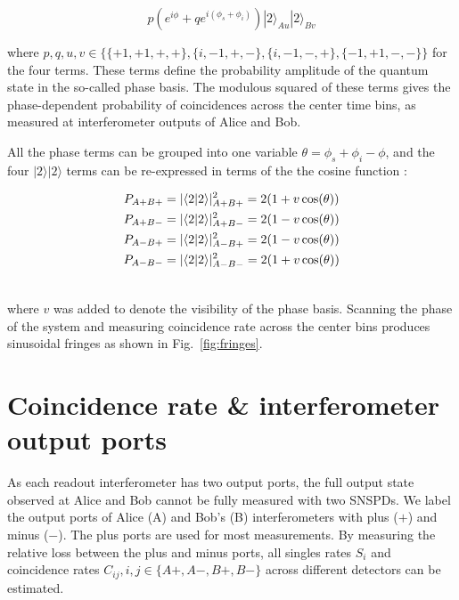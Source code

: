 \documentclass[11pt]{caltech_thesis} %
\begin{document}
$$p\left(e^{i \phi}+qe^{i\left(\phi_s+\phi_i\right)}\right)|2\rangle_{Au}|2\rangle_{Bv} $$

where $p, q, u, v \in \{\{+1,+1, +, +\}, \{i,-1, +, -\}, \{i,-1, -, +\}, \{-1,+1, -, -\}\}$ for the four terms. These terms define the probability amplitude of the quantum state in the so-called phase basis. The modulous squared of these terms gives the phase-dependent probability of coincidences across the center time bins, as measured at interferometer outputs of Alice and Bob.

All the phase terms can be grouped into one variable $\theta = \phi_s + \phi_i - \phi$, and the four $|2\rangle|2\rangle$ terms can be re-expressed in terms of the the cosine function \autocite{Marcikic2002,Kim2022}:

\hypertarget{eq:cosines}{}{ 
\begin{align}
P_{A+ B+} &= |\langle 2|2\rangle|^2_{A+ B+} = 2(1 + v \cos(\theta)) \label{eq:cosines}\\
P_{A+ B-} &= |\langle 2|2\rangle|^2_{A+ B-} = 2(1 - v \cos(\theta)) \notag \\
P_{A- B+} &= |\langle 2|2\rangle|^2_{A- B+} = 2(1 - v \cos(\theta)) \notag \\
P_{A- B-} &= |\langle 2|2\rangle|^2_{A- B-} = 2(1 + v \cos(\theta)) \notag \\ \notag
\end{align}
}

where $v$ was added to denote the visibility of the phase basis. Scanning the phase of the system and measuring coincidence rate across the center bins produces sinusoidal fringes as shown in Fig.~\ref{fig:fringes}.

\hypertarget{coincidence-rate-interferometer-output-ports}{%
\section{Coincidence rate \& interferometer output ports}\label{coincidence-rate-interferometer-output-ports}}

As each readout interferometer has two output ports, the full output state observed at Alice and Bob cannot be fully measured with two SNSPDs. We label the output ports of Alice (A) and Bob's (B) interferometers with plus ($+$) and minus ($-$). The plus ports are used for most measurements. By measuring the relative loss between the plus and minus ports, all singles rates $S_i$ and coincidence rates $C_{ij}, i,j \in \{A+, A-, B+, B-\}$ across different detectors can be estimated.
\end{document}
